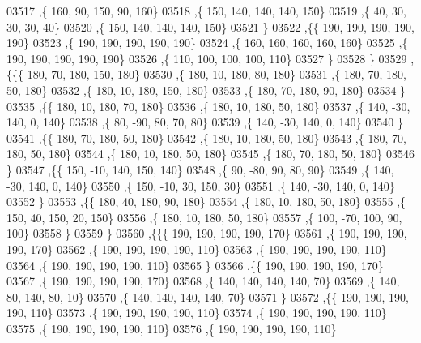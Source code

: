 \begin{DoxyCode}
03517     ,\{   160,    90,   150,    90,   160\}
03518     ,\{   150,   140,   140,   140,   150\}
03519     ,\{    40,    30,    30,    30,    40\}
03520     ,\{   150,   140,   140,   140,   150\}
03521     \}
03522    ,\{\{   190,   190,   190,   190,   190\}
03523     ,\{   190,   190,   190,   190,   190\}
03524     ,\{   160,   160,   160,   160,   160\}
03525     ,\{   190,   190,   190,   190,   190\}
03526     ,\{   110,   100,   100,   100,   110\}
03527     \}
03528    \}
03529   ,\{\{\{   180,    70,   180,   150,   180\}
03530     ,\{   180,    10,   180,    80,   180\}
03531     ,\{   180,    70,   180,    50,   180\}
03532     ,\{   180,    10,   180,   150,   180\}
03533     ,\{   180,    70,   180,    90,   180\}
03534     \}
03535    ,\{\{   180,    10,   180,    70,   180\}
03536     ,\{   180,    10,   180,    50,   180\}
03537     ,\{   140,   -30,   140,     0,   140\}
03538     ,\{    80,   -90,    80,    70,    80\}
03539     ,\{   140,   -30,   140,     0,   140\}
03540     \}
03541    ,\{\{   180,    70,   180,    50,   180\}
03542     ,\{   180,    10,   180,    50,   180\}
03543     ,\{   180,    70,   180,    50,   180\}
03544     ,\{   180,    10,   180,    50,   180\}
03545     ,\{   180,    70,   180,    50,   180\}
03546     \}
03547    ,\{\{   150,   -10,   140,   150,   140\}
03548     ,\{    90,   -80,    90,    80,    90\}
03549     ,\{   140,   -30,   140,     0,   140\}
03550     ,\{   150,   -10,    30,   150,    30\}
03551     ,\{   140,   -30,   140,     0,   140\}
03552     \}
03553    ,\{\{   180,    40,   180,    90,   180\}
03554     ,\{   180,    10,   180,    50,   180\}
03555     ,\{   150,    40,   150,    20,   150\}
03556     ,\{   180,    10,   180,    50,   180\}
03557     ,\{   100,   -70,   100,    90,   100\}
03558     \}
03559    \}
03560   ,\{\{\{   190,   190,   190,   190,   170\}
03561     ,\{   190,   190,   190,   190,   170\}
03562     ,\{   190,   190,   190,   190,   110\}
03563     ,\{   190,   190,   190,   190,   110\}
03564     ,\{   190,   190,   190,   190,   110\}
03565     \}
03566    ,\{\{   190,   190,   190,   190,   170\}
03567     ,\{   190,   190,   190,   190,   170\}
03568     ,\{   140,   140,   140,   140,    70\}
03569     ,\{   140,    80,   140,    80,    10\}
03570     ,\{   140,   140,   140,   140,    70\}
03571     \}
03572    ,\{\{   190,   190,   190,   190,   110\}
03573     ,\{   190,   190,   190,   190,   110\}
03574     ,\{   190,   190,   190,   190,   110\}
03575     ,\{   190,   190,   190,   190,   110\}
03576     ,\{   190,   190,   190,   190,   110\}

\end{DoxyCode}
